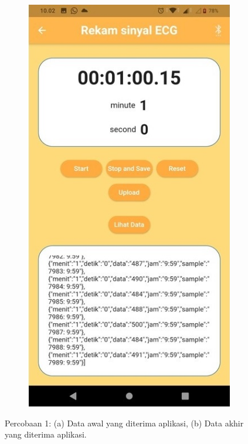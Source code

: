 \begin{figure}[H]
\begin{subfigure}{0.45\textwidth}
		\caption{}		
	\end{subfigure}
	\begin{subfigure}{0.45\textwidth}
		\centering
		\includegraphics[width=1\linewidth]{img/percob/Slide11b.jpg}	  
		\caption{}		
	\end{subfigure}
	\caption{Percobaan 1: (a) Data awal yang diterima aplikasi, (b) Data akhir yang diterima aplikasi.}
	\label{fig:4.2.0}
\end{figure}
